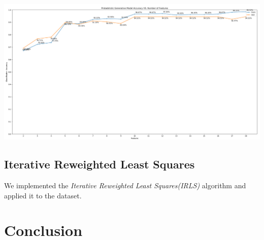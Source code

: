 \documentclass[a4paper,11pt,oneside]{article}
\begin{document}
\hspace*{-2cm}\includegraphics[scale=0.35]{pgm.png}

\subsection{Iterative Reweighted Least Squares}

We implemented the \textit{Iterative Reweighted Least Squares(IRLS)} algorithm and applied it to the dataset. 
 	
 	
\section{Conclusion}
\end{document}
